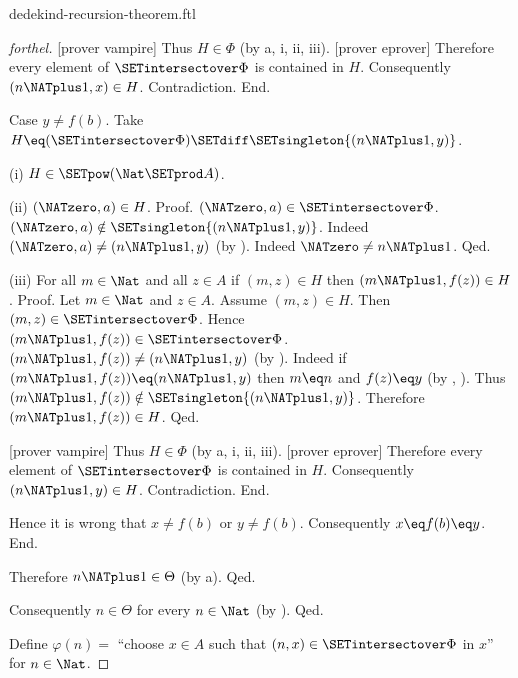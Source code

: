 \documentclass{naproche-library}
\begin{document}
\begin{smodule}[title=Dedekind's Recursion Theorem]{dedekind-recursion-theorem.ftl}
\begin{proof}[forthel]
          [prover vampire]
          Thus $H \in \Phi$ (by a, i, ii, iii).
          [prover eprover]
          Therefore every element of $\SETintersectover \Phi$ is contained in $H$.
          Consequently $(n \NATplus 1,x) \in H$.
          Contradiction.
        End.

        Case $y \neq f(b)$.
          Take $H \eq (\SETintersectover \Phi) \SETdiff \SETsingleton{(n \NATplus 1,y)}$.

          (i) $H \in \SETpow(\Nat \SETprod A)$.

          (ii) $(\NATzero,a) \in H$. \newline
          Proof.
            $(\NATzero,a) \in \SETintersectover \Phi$.
            $(\NATzero,a) \notin \SETsingleton{(n \NATplus 1,y)}$.
            Indeed $(\NATzero,a) \neq (n \NATplus 1,y)$ (by ).
            Indeed $\NATzero \neq n \NATplus 1$.
          Qed.

          (iii) For all $m \in \Nat$ and all $z \in A$ if $(m,z) \in H$ then $(m \NATplus 1,f(z)) \in H$. \newline
          Proof.
            Let $m \in \Nat$ and $z \in A$.
            Assume $(m,z) \in H$.
            Then $(m,z) \in \SETintersectover \Phi$.
            Hence $(m \NATplus 1,f(z)) \in \SETintersectover \Phi$.
            $(m \NATplus 1,f(z)) \neq (n \NATplus 1,y)$ (by ).
            Indeed if $(m \NATplus 1,f(z)) \eq (n \NATplus 1,y)$ then $m \eq n$ and $f(z) \eq y$ (by , ).
            Thus $(m \NATplus 1,f(z)) \notin \SETsingleton{(n \NATplus 1,y)}$.
            Therefore $(m \NATplus 1,f(z)) \in H$.
          Qed.

          [prover vampire]
          Thus $H \in \Phi$ (by a, i, ii, iii).
          [prover eprover]
          Therefore every element of $\SETintersectover \Phi$ is contained in $H$.
          Consequently $(n \NATplus 1,y) \in H$.
          Contradiction.
        End.

        Hence it is wrong that $x \neq f(b)$ or $y \neq f(b)$.
        Consequently $x \eq f(b) \eq y$.
      End.

      Therefore $n \NATplus 1 \in \Theta$ (by a).
    Qed.

    Consequently $n \in \Theta$ for every $n \in \Nat$ (by ).
  Qed.

  Define $\varphi(n) =$ ``choose $x \in A$ such that $(n, x) \in
  \SETintersectover \Phi$ in $x$'' for $n \in \Nat$.


\end{proof}
\end{smodule}
\end{document}
